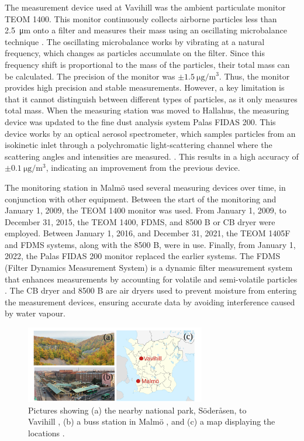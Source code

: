 The measurement device used at Vavihill was the ambient particulate monitor TEOM 1400. This monitor continuously collects airborne particles less than \SI{2.5}{\micro\meter} onto a filter and measures their mass using an oscillating microbalance technique \cite{thermofisherscientificinc.TEOMSeries1400a2007}. The oscillating microbalance works by vibrating at a natural frequency, which changes as particles accumulate on the filter. Since this frequency shift is proportional to the mass of the particles, their total mass can be calculated. The precision of the monitor was $\pm\SI{1.5}{\micro\gram\per\meter\cubed}$. Thus, the monitor provides high precision and stable measurements. However, a key limitation is that it cannot distinguish between different types of particles, as it only measures total mass. When the measuring station was moved to Hallahus, the measuring device was updated to the fine dust analysis system Palas FIDAS 200. This device works by an optical aerosol spectrometer, which samples particles from an isokinetic inlet through a polychromatic light-scattering channel where the scattering angles and intensities are measured. \cite{palasgmbhOperatingManualFidas}. This results in a high accuracy of $\pm\SI{0.1}{\micro\gram\per\meter\cubed}$, indicating an improvement from the previous device. 

The monitoring station in Malmö used several measuring devices over time, in conjunction with other equipment. Between the start of the monitoring and January 1, 2009, the TEOM 1400 monitor was used. From January 1, 2009, to December 31, 2015, the TEOM 1400, FDMS, and 8500 B or CB dryer were employed. Between January 1, 2016, and December 31, 2021, the TEOM 1405F and FDMS systems, along with the 8500 B, were in use. Finally, from January 1, 2022, the Palas FIDAS 200 monitor replaced the earlier systems. The FDMS (Filter Dynamics Measurement System) is a dynamic filter measurement system that enhances measurements by accounting for volatile and semi-volatile particles \cite{thermoscientific8500FDMSFilter2010}. The CB dryer and 8500 B are air dryers used to prevent moisture from entering the measurement devices, ensuring accurate data by avoiding interference caused by water vapour.

\begin{figure}[H]
    \centering
    \includegraphics[width=0.7\textwidth]{Figures/Pictures.pdf}
    \caption{Pictures showing (a) the nearby national park, Söderåsen, to Vavihill \cite{s.perssonAutumnColorsSoderasen}, (b) a buss station in Malmö \cite{j.jonssonjulleSodervarnBusStation2015}, and (c) a map displaying the locations \cite{e.frohneLocationMapSkane2009}.  }
    \label{fig:locations}
\end{figure}


